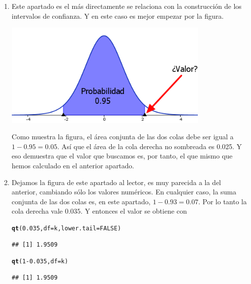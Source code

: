 \documentclass[10pt,a4paper]{article}\usepackage[]{graphicx}\usepackage[]{color}
\makeatletter
\newcommand{\hlnum}[1]{\textcolor[rgb]{0.686,0.059,0.569}{#1}}%
\newcommand{\hlopt}[1]{\textcolor[rgb]{0,0,0}{#1}}%
\newcommand{\hlstd}[1]{\textcolor[rgb]{0.345,0.345,0.345}{#1}}%
\newcommand{\hlkwc}[1]{\textcolor[rgb]{0.333,0.667,0.333}{#1}}%
\newcommand{\hlkwd}[1]{\textcolor[rgb]{0.737,0.353,0.396}{\textbf{#1}}}%
\newenvironment{kframe}{%
 \def\at@end@of@kframe{}%
 \ifinner\ifhmode%
  \def\at@end@of@kframe{\end{minipage}}%
  \begin{minipage}{\columnwidth}%
 \fi\fi%
 \def\FrameCommand##1{\hskip\@totalleftmargin \hskip-\fboxsep
 \colorbox{shadecolor}{##1}\hskip-\fboxsep
     \hskip-\linewidth \hskip-\@totalleftmargin \hskip\columnwidth}%
 \MakeFramed {\advance\hsize-\width
   \@totalleftmargin\z@ \linewidth\hsize
   \@setminipage}}%
 {\par\unskip\endMakeFramed%
 \at@end@of@kframe}
\newenvironment{knitrout}{}{} %
\makeatother
\begin{document}
\begin{enumerate}
  \item
  Este apartado es el más directamente se relaciona con la construcción de los intervalos de confianza. Y en este caso es mejor empezar por la figura.
  \begin{center}
        \includegraphics[width=10cm]{../fig/Tut06-27.png}
  \end{center}
  Como muestra la figura, el área conjunta de las dos colas debe ser igual a $1-0.95=0.05$. Así que el área de la cola derecha no sombreada es 0.025. Y eso demuestra que el valor que buscamos es, por tanto, el que mismo que hemos calculado en el anterior apartado.

  \item Dejamos la figura de este apartado al lector, es muy parecida a la del anterior, cambiando sólo los valores numéricos. En cualquier caso, la suma conjunta de las dos colas es, en este apartado, $1 - 0.93 = 0.07$. Por lo tanto la cola derecha vale $0.035$. Y entonces el valor se obtiene con
\begin{knitrout}
\color{fgcolor}\begin{kframe}
\begin{alltt}
\hlkwd{qt}\hlstd{(}\hlnum{0.035}\hlstd{,} \hlkwc{df}\hlstd{=k,} \hlkwc{lower.tail}\hlstd{=}\hlnum{FALSE}\hlstd{)}
\end{alltt}
\begin{verbatim}
## [1] 1.9509
\end{verbatim}
\begin{alltt}
\hlkwd{qt}\hlstd{(}\hlnum{1}\hlopt{-} \hlnum{0.035}\hlstd{,} \hlkwc{df}\hlstd{=k)}
\end{alltt}
\begin{verbatim}
## [1] 1.9509
\end{verbatim}
\end{kframe}
\end{knitrout}

\end{enumerate}
\end{document}
